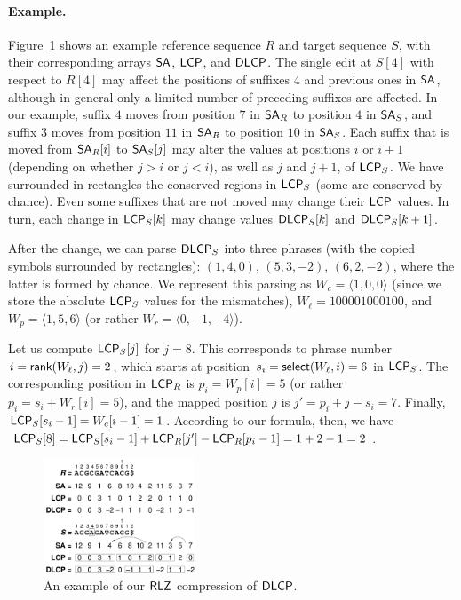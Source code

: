 \paragraph{Example.}
Figure~\ref{fig:ex} shows an example reference sequence $R$ and target
sequence $S$, with their corresponding arrays $\textsf{SA}$, $\textsf{LCP}$, and $\textsf{DLCP}$.
The single edit at $S[4]$ with respect to $R[4]$ may affect the positions
of suffixes $4$ and previous ones in $\textsf{SA}$, although in general only a limited
number of preceding suffixes are affected. In our example, suffix $4$ moves
from position $7$ in $\textsf{SA}_R$ to position $4$ in $\textsf{SA}_S$, and suffix $3$ moves
from position $11$ in $\textsf{SA}_R$ to position $10$ in $\textsf{SA}_S$. Each suffix that
is moved from $\textsf{SA}_R[i]$ to $\textsf{SA}_S[j]$ may alter the values at positions $i$ 
or $i+1$ (depending on whether $j>i$ or $j<i$), as well as $j$ and $j+1$, of
$\textsf{LCP}_S$. We have surrounded in rectangles the conserved regions in $\textsf{LCP}_S$
(some are conserved by chance). Even some suffixes that 
are not moved may change their $\textsf{LCP}$ values. In turn, each change in 
$\textsf{LCP}_S[k]$ may change values $\textsf{DLCP}_S[k]$ and $\textsf{DLCP}_S[k+1]$.

After the change, we can parse $\textsf{DLCP}_S$ into three phrases (with the copied
symbols surrounded by rectangles):
$(1,4,0)$, $(5,3,-2)$, $(6,2,-2)$, where the latter is formed by chance.
We represent this parsing as $W_c = \langle 1,0,0 \rangle$ (since we store the
absolute $\textsf{LCP}_S$ values for the mismatches), $W_\ell = 100001000100$, and
$W_p = \langle 1,5,6 \rangle$ (or rather $W_r = \langle 0,-1,-4 \rangle$).

Let us compute $\textsf{LCP}_S[j]$ for $j=8$. This corresponds to phrase number
$i = \textsf{rank}(W_\ell,j) = 2$, which starts at position $s_i = \textsf{select}(W_\ell,i)=6$
in $\textsf{LCP}_S$. The corresponding position in $\textsf{LCP}_R$ is $p_i = W_p[i] = 5$
(or rather $p_i = s_i + W_r[i] = 5$), and the mapped position $j$ is
$j' = p_i+j-s_i = 7$. Finally, $\textsf{LCP}_S[s_i-1] = W_c[i-1]=1$.
According to our formula, then, we have
$\textsf{LCP}_S[8] = \textsf{LCP}_S[s_i-1] + \textsf{LCP}_R[j'] - \textsf{LCP}_R[p_i-1] = 1+2-1=2$.

\begin{figure}
\centerline{\includegraphics[width=0.4\textwidth]{ex.pdf}}
\caption{An example of our $\textsf{RLZ}$ compression of $\textsf{DLCP}$.}
\label{fig:ex}
\end{figure}

